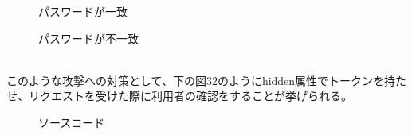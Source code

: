 \documentclass[dvipdfmx,autodetect-engine,titlepage]{jsarticle}
\begin{document}
\begin{figure}[H]
  \centering
  \begin{minipage}[b]{0.45\linewidth}
  \begin{center}
    \end{center}
    \caption{パスワードが一致}
  \end{minipage}
  \begin{minipage}[b]{0.45\linewidth}
  \begin{center}
    \end{center}
    \caption{パスワードが不一致}
  \end{minipage}
\end{figure}
　\\

このような攻撃への対策として、下の図32のようにhidden属性でトークンを持たせ、リクエストを受けた際に利用者の確認をすることが挙げられる。\\
\begin{figure}[H]
  \centering
  \caption{ソースコード}\label{fig:図32}
\end{figure}
\end{document}
